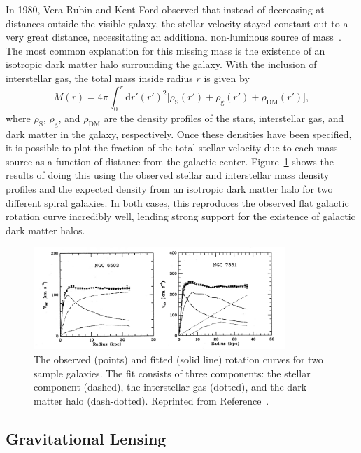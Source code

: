 In 1980, Vera Rubin and Kent Ford observed that instead of decreasing at distances outside the visible galaxy, the stellar velocity stayed constant out to a very great distance, necessitating an additional non-luminous source of mass~\cite{Rubin1980}. 
The most common explanation for this missing mass is the existence of an isotropic dark matter halo surrounding the galaxy.
With the inclusion of interstellar gas, the total mass inside radius $r$ is given by
\begin{equation}
  M(r) = 4 \pi \int_0^r \text{d}r' (r')^2 \Big[\rho_{\text{S}}(r') + \rho_{\text{g}}(r') + \rho_{\text{DM}}(r') \Big],
\end{equation}
where $\rho_{\text{S}}$, $\rho_{\text{g}}$, and $\rho_{\text{DM}}$ are the density profiles of the stars, interstellar gas, and dark matter in the galaxy, respectively.
Once these densities have been specified, it is possible to plot the fraction of the total stellar velocity due to each mass source as a function of distance from the galactic center.
Figure~\ref{fig:rotation_curves} shows the results of doing this using the observed stellar and interstellar mass density profiles and the expected density from an isotropic dark matter halo for two different spiral galaxies.
In both cases, this reproduces the observed flat galactic rotation curve incredibly well, lending strong support for the existence of galactic dark matter halos. 

\begin{figure}[htbp]
  \centering
  \includegraphics[width=0.85\textwidth]{DarkMatter/Figures/rotation_curves.png}
  \caption{
    The observed (points) and fitted (solid line) rotation curves for two sample galaxies.
    The fit consists of three components: the stellar component (dashed), the interstellar gas (dotted), and the dark matter halo (dash-dotted).
    Reprinted from Reference~\cite{Begeman1991}.
  }
  \label{fig:rotation_curves}
\end{figure}

\subsection{Gravitational Lensing}
\label{sec:dm_lensing}

